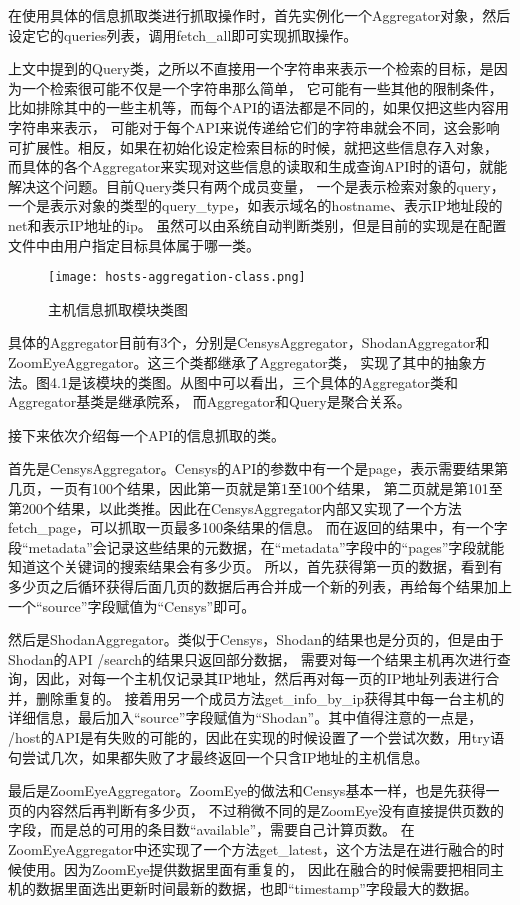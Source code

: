 在使用具体的信息抓取类进行抓取操作时，首先实例化一个Aggregator对象，然后设定它的queries列表，调用fetch\_all即可实现抓取操作。

上文中提到的Query类，之所以不直接用一个字符串来表示一个检索的目标，是因为一个检索很可能不仅是一个字符串那么简单，
它可能有一些其他的限制条件，比如排除其中的一些主机等，而每个API的语法都是不同的，如果仅把这些内容用字符串来表示，
可能对于每个API来说传递给它们的字符串就会不同，这会影响可扩展性。相反，如果在初始化设定检索目标的时候，就把这些信息存入对象，
而具体的各个Aggregator来实现对这些信息的读取和生成查询API时的语句，就能解决这个问题。目前Query类只有两个成员变量，
一个是表示检索对象的query，一个是表示对象的类型的query\_type，如表示域名的hostname、表示IP地址段的net和表示IP地址的ip。
虽然可以由系统自动判断类别，但是目前的实现是在配置文件中由用户指定目标具体属于哪一类。

\begin{figure}[H]
    \centering
    \texttt{[image: hosts-aggregation-class.png]}
    \caption{主机信息抓取模块类图}
    \label{fig:comparation}
\end{figure}

具体的Aggregator目前有3个，分别是CensysAggregator，ShodanAggregator和ZoomEyeAggregator。这三个类都继承了Aggregator类，
实现了其中的抽象方法。图4.1是该模块的类图。从图中可以看出，三个具体的Aggregator类和Aggregator基类是继承院系，
而Aggregator和Query是聚合关系。

接下来依次介绍每一个API的信息抓取的类。

首先是CensysAggregator。Censys的API的参数中有一个是page，表示需要结果第几页，一页有100个结果，因此第一页就是第1至100个结果，
第二页就是第101至第200个结果，以此类推。因此在CensysAggregator内部又实现了一个方法fetch\_page，可以抓取一页最多100条结果的信息。
而在返回的结果中，有一个字段“metadata”会记录这些结果的元数据，在“metadata”字段中的“pages”字段就能知道这个关键词的搜索结果会有多少页。
所以，首先获得第一页的数据，看到有多少页之后循环获得后面几页的数据后再合并成一个新的列表，再给每个结果加上一个“source”字段赋值为“Censys”即可。

然后是ShodanAggregator。类似于Censys，Shodan的结果也是分页的，但是由于Shodan的API /search的结果只返回部分数据，
需要对每一个结果主机再次进行查询，因此，对每一个主机仅记录其IP地址，然后再对每一页的IP地址列表进行合并，删除重复的。
接着用另一个成员方法get\_info\_by\_ip获得其中每一台主机的详细信息，最后加入“source”字段赋值为“Shodan”。其中值得注意的一点是，
/host的API是有失败的可能的，因此在实现的时候设置了一个尝试次数，用try语句尝试几次，如果都失败了才最终返回一个只含IP地址的主机信息。

最后是ZoomEyeAggregator。ZoomEye的做法和Censys基本一样，也是先获得一页的内容然后再判断有多少页，
不过稍微不同的是ZoomEye没有直接提供页数的字段，而是总的可用的条目数“available”，需要自己计算页数。
在ZoomEyeAggregator中还实现了一个方法get\_latest，这个方法是在进行融合的时候使用。因为ZoomEye提供数据里面有重复的，
因此在融合的时候需要把相同主机的数据里面选出更新时间最新的数据，也即“timestamp”字段最大的数据。



